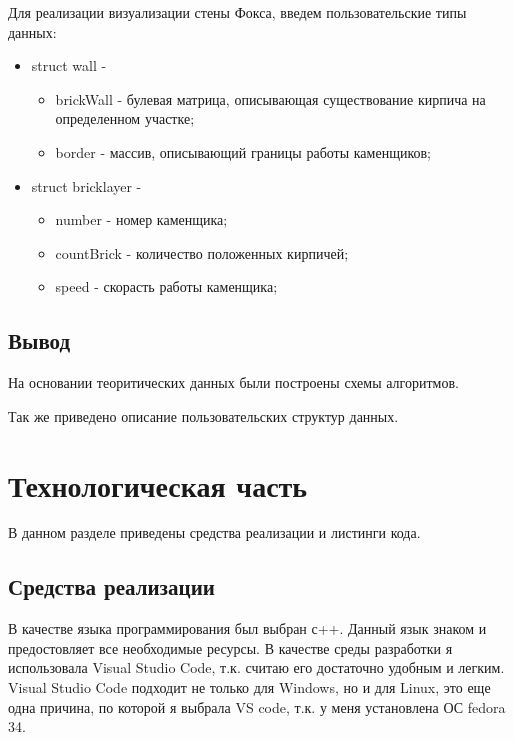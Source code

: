 \documentclass[12pt,a4paper]{report}
\begin{document}

Для реализации визуализации стены Фокса, введем пользовательские типы данных:
\begin{itemize}
	\item struct wall - 
	\begin{itemize}
		\item brickWall - булевая матрица, описывающая существование кирпича на определенном участке;
		\item border - массив, описывающий границы работы каменщиков;
	\end{itemize}
	
	\item struct bricklayer -
	\begin{itemize}
		\item number - номер каменщика;
		\item countBrick - количество положенных кирпичей;
		\item speed - скорасть работы каменщика;
	\end{itemize}
\end{itemize}



\section*{Вывод}
На основании теоритических данных были построены схемы алгоритмов.

Так же приведено описание пользовательских структур данных.



\newpage
\chapter{Технологическая часть} 

В данном разделе приведены средства реализации и листинги кода.



\section{Средства реализации}
В качестве языка программирования был выбран с++. Данный язык знаком и предостовляет все необходимые ресурсы.
В качестве среды разработки я использовала Visual Studio Code, т.к. считаю его достаточно удобным и легким.
Visual Studio Code подходит не только для  Windows, но и для Linux, это еще одна причина, по которой я выбрала VS code, т.к. у меня установлена ОС  fedora 34.
\end{document}
